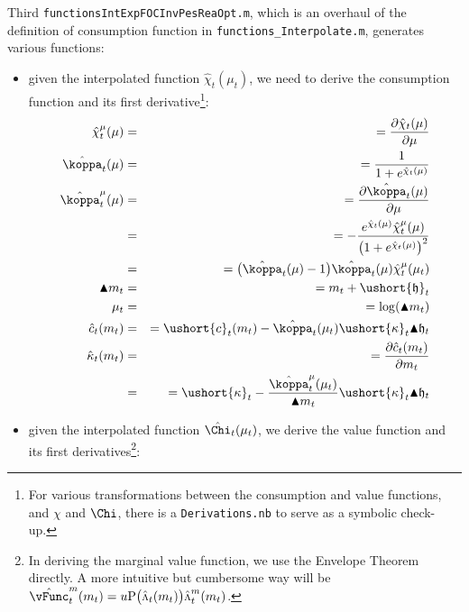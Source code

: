\documentclass[titlepage,abstract]{\econtex}
\providecommand{\vInv}{\ensuremath{\scriptstyle \Lambda \displaystyle}}
\begin{document}
Third \texttt{functionsIntExpFOCInvPesReaOpt.m}, which is an overhaul of the definition of consumption function in \texttt{functions\_Interpolate.m}, generates various functions:
\begin{itemize}
        \item given the interpolated function $\hat{\chi}_{t}(\mu_{t})$, we need to derive the consumption function and its first derivative\footnote{For various transformations between the consumption and value functions, and $\chi$ and $\Chi$, there is a \texttt{Derivations.nb} to serve as a symbolic check-up.}:
            \begin{equation}\begin{gathered}\begin{aligned}
            \hat{\chi}^{\mu}_{t}(\mu)  &=& =  \frac{\partial \hat{\chi}_{t}(\mu)}{\partial \mu} \\
            \hat{\koppa}_{t} (\mu)  &=& = \frac{1}{1+e^{\hat{\chi}_{t}(\mu)}} \\
            \hat{\koppa}^{\mu}_{t} (\mu)  &=& =  \frac{\partial \hat{\koppa}_{t} (\mu)}{\partial \mu} \\
             &=& =  -\frac{e^{\hat{\chi}_{t}(\mu)} \hat{\chi}^{\mu}_{t}(\mu)}{\big(1+e^{\hat{\chi}_{t}(\mu)}\big)^{2}} \\
             &=& =  \big(\hat{\koppa}_{t} (\mu)-1\big)\hat{\koppa}_{t} (\mu) \hat{\chi}^{\mu}_{t}(\mu_{t}) \\
            \blacktriangle m_{t}  &=& =  m_{t} + \ushort{\mathfrak{h}}_{t} \\
            \mu_{t}  &=& =  \log(\blacktriangle m_{t}) \\
            \hat{c}_{t}(m_{t})  &=& =  \ushort{c}_{t}(m_{t})-\hat{\koppa}_{t}(\mu_{t}) \ushort{\kappa}_{t} \blacktriangle \mathfrak{h}_{t} \\
            \hat{\kappa}_{t}(m_{t})  &=& =  \frac{\partial \hat{c}_{t}(m_{t})}{\partial m_{t}} \\
             &=& =  \ushort{\kappa}_{t}-\frac{\hat{\koppa}^{\mu}_{t}(\mu_{t})}{\blacktriangle m_{t}} \ushort{\kappa}_{t} \blacktriangle \mathfrak{h}_{t} \\
            \end{aligned}\end{gathered}\end{equation}
        \item given the interpolated function $\hat{\Chi}_{t}(\mu_{t})$, we derive the value function and its first derivatives\footnote{In deriving the marginal value function, we use the Envelope Theorem directly. A more intuitive but cumbersome way will be $\hat{\vFunc}_{t}^{m} (m_{t}) = u\text{P}\big(\hat{\vInv}_{t}(m_{t})\big) \hat{\vInv}_{t}^{m} (m_{t})$.}:

\end{itemize}
\end{document}
